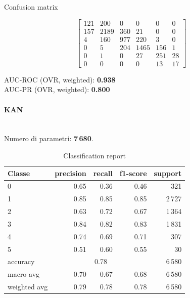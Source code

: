 \documentclass[a4paper,12pt]{report}
\begin{document}
	\begin{table}[H]
		\centering
		\caption{Confusion matrix}
		\label{tab:cm_mlp}
		\[
		\begin{bmatrix}
			121 & 200 & 0   & 0   & 0   & 0   \\
			157 & 2189& 360 & 21  & 0   & 0   \\
			4   & 160 & 977 & 220 & 3   & 0   \\
			0   & 5   & 204 & 1465& 156 & 1   \\
			0   & 1   & 0   & 27  & 251 & 28  \\
			0   & 0   & 0   & 0   & 13  & 17
		\end{bmatrix}
		\]
		\vspace{1mm}
		
		AUC-ROC (OVR, weighted): \textbf{0.938} \\
		AUC-PR  (OVR, weighted): \textbf{0.800}
	\end{table}
	
	
	\paragraph{KAN} \mbox{}\\
	Numero di parametri: \textbf{7\,680}.
	
	\begin{table}[H]
		\centering
		\caption{Classification report}
		\label{tab:cr_kan}
		\begin{tabular}{lrrrr}
			\toprule
			Classe & precision & recall & f1-score & support \\
			\midrule
			0 & 0.65 & 0.36 & 0.46 & 321 \\
			1 & 0.85 & 0.85 & 0.85 & 2\,727 \\
			2 & 0.63 & 0.72 & 0.67 & 1\,364 \\
			3 & 0.84 & 0.82 & 0.83 & 1\,831 \\
			4 & 0.74 & 0.69 & 0.71 & 307 \\
			5 & 0.51 & 0.60 & 0.55 & 30 \\
			\midrule
			accuracy & \multicolumn{3}{c}{0.78} & 6\,580 \\
			macro avg & 0.70 & 0.67 & 0.68 & 6\,580 \\
			weighted avg & 0.79 & 0.78 & 0.78 & 6\,580 \\
			\bottomrule
		\end{tabular}
	\end{table}
	
\end{document}
